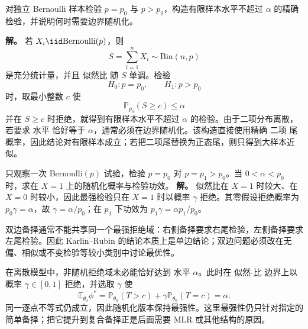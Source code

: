 \begin{exbox}[精确二项单侧检验]
对独立 Bernoulli 样本检验 $p=p_0$ 与 $p>p_0$，构造有限样本水平不超过 $\alpha$ 的精确检验，并说明何时需要边界随机化。

\textbf{解。} 若 $X_i\iid\mathrm{Bernoulli}(p)$，则
\[
 S=\sum_{i=1}^nX_i\sim\mathrm{Bin}(n,p)
\]
是充分统计量，并且 似然比 随 $S$ 单调。检验
\[
 H_0:p=p_0,
 \qquad
 H_1:p>p_0
\]
时，取最小整数 $c$ 使
\[
 \mathbb P_{p_0}(S\ge c)\le\alpha
\]
并在 $S\ge c$ 时拒绝，就得到有限样本水平不超过 $\alpha$ 的检验。由于二项分布离散，若要求 水平 恰好等于 $\alpha$，通常必须在边界随机化。该构造直接使用精确 二项 尾概率，因此结论对有限样本成立；若把二项尾替换为正态尾，则只得到大样本近似。
\end{exbox}

\begin{note}[双侧最优性与离散随机化]
\begin{workedexample}[一次试验的随机化阈值]
只观察一次 Bernoulli\((p)\) 试验，检验 \(p=p_0\) 对 \(p=p_1>p_0\)。当 \(0<\alpha<p_0\) 时，求在 \(X=1\) 上的随机化概率与检验功效。
\textbf{解。} 似然比在 \(X=1\) 时较大、在 \(X=0\) 时较小，因此最强检验只在 \(X=1\) 时以概率 \(\gamma\) 拒绝。其零假设拒绝概率为 \(p_0\gamma=\alpha\)，故 \(\gamma=\alpha/p_0\)；在 \(p_1\) 下功效为 \(p_1\gamma=\alpha p_1/p_0\)。
\end{workedexample}

双边备择通常不能共享同一个最强拒绝域：右侧备择要求右尾检验，左侧备择要求左尾检验。因此 Karlin--Rubin 的结论本质上是单边结论；双边问题必须改在无偏、相似或不变检验等较小类别中讨论最优性。

在离散模型中，非随机拒绝域未必能恰好达到 水平 $\alpha$。此时在 似然-比 边界上以概率 $\gamma\in[0,1]$ 拒绝，并选取 $\gamma$ 使
\[
\mathbb E_{\theta_0}\phi^*=\mathbb P_{\theta_0}(T>c)+\gamma\mathbb P_{\theta_0}(T=c)=\alpha.
\]
同一逐点不等式仍成立，因此随机化版本保持最强性。这里最强性仍只针对指定的简单备择；把它提升到复合备择正是后面需要 MLR 或其他结构的原因。
\end{note}

